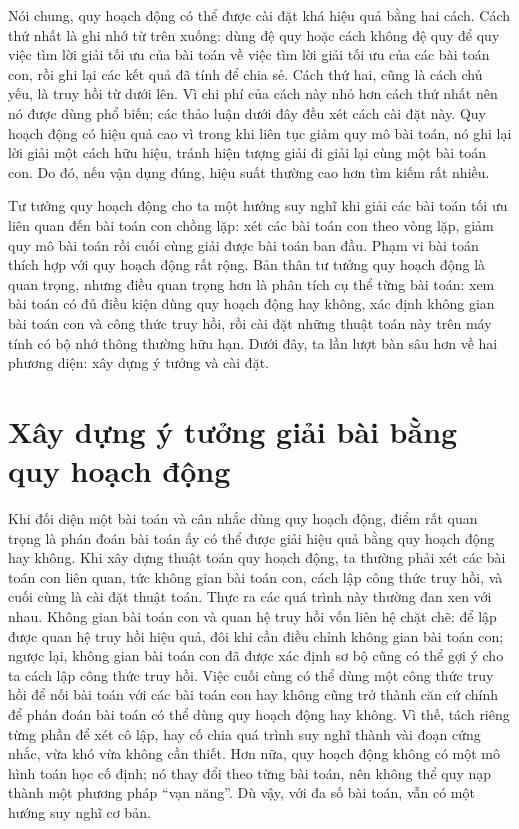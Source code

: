 \documentclass[11pt]{article}
\begin{document}
Nói chung, quy hoạch động có thể được cài đặt khá hiệu quả bằng hai cách. Cách
thứ nhất là ghi nhớ từ trên xuống: dùng đệ quy hoặc cách không đệ quy để quy
việc tìm lời giải tối ưu của bài toán về việc tìm lời giải tối ưu của các bài
toán con, rồi ghi lại các kết quả đã tính để chia sẻ. Cách thứ hai, cũng là
cách chủ yếu, là truy hồi từ dưới lên. Vì chi phí của cách này nhỏ hơn cách
thứ nhất nên nó được dùng phổ biến; các thảo luận dưới đây đều xét cách cài
đặt này. Quy hoạch động có hiệu quả cao vì trong khi liên tục giảm quy mô bài
toán, nó ghi lại lời giải một cách hữu hiệu, tránh hiện tượng giải đi giải lại
cùng một bài toán con. Do đó, nếu vận dụng đúng, hiệu suất thường cao hơn tìm
kiếm rất nhiều.

Tư tưởng quy hoạch động cho ta một hướng suy nghĩ khi giải các bài toán tối
ưu liên quan đến bài toán con chồng lặp: xét các bài toán con theo vòng lặp,
giảm quy mô bài toán rồi cuối cùng giải được bài toán ban đầu. Phạm vi bài
toán thích hợp với quy hoạch động rất rộng. Bản thân tư tưởng quy hoạch động
là quan trọng, nhưng điều quan trọng hơn là phân tích cụ thể từng bài toán:
xem bài toán có đủ điều kiện dùng quy hoạch động hay không, xác định không
gian bài toán con và công thức truy hồi, rồi cài đặt những thuật toán này trên
máy tính có bộ nhớ thông thường hữu hạn. Dưới đây, ta lần lượt bàn sâu hơn về
hai phương diện: xây dựng ý tưởng và cài đặt.

\section{Xây dựng ý tưởng giải bài bằng quy hoạch động}

Khi đối diện một bài toán và cân nhắc dùng quy hoạch động, điểm rất quan trọng
là phán đoán bài toán ấy có thể được giải hiệu quả bằng quy hoạch động hay
không. Khi xây dựng thuật toán quy hoạch động, ta thường phải xét các bài toán
con liên quan, tức không gian bài toán con, cách lập công thức truy hồi, và
cuối cùng là cài đặt thuật toán. Thực ra các quá trình này thường đan xen với
nhau. Không gian bài toán con và quan hệ truy hồi vốn liên hệ chặt chẽ: để lập
được quan hệ truy hồi hiệu quả, đôi khi cần điều chỉnh không gian bài toán
con; ngược lại, không gian bài toán con đã được xác định sơ bộ cũng có thể gợi
ý cho ta cách lập công thức truy hồi. Việc cuối cùng có thể dùng một công thức
truy hồi để nối bài toán với các bài toán con hay không cũng trở thành căn cứ
chính để phán đoán bài toán có thể dùng quy hoạch động hay không. Vì thế, tách
riêng từng phần để xét cô lập, hay cố chia quá trình suy nghĩ thành vài đoạn
cứng nhắc, vừa khó vừa không cần thiết. Hơn nữa, quy hoạch động không có một
mô hình toán học cố định; nó thay đổi theo từng bài toán, nên không thể quy
nạp thành một phương pháp ``vạn năng''. Dù vậy, với đa số bài toán, vẫn có một
hướng suy nghĩ cơ bản.
\end{document}
